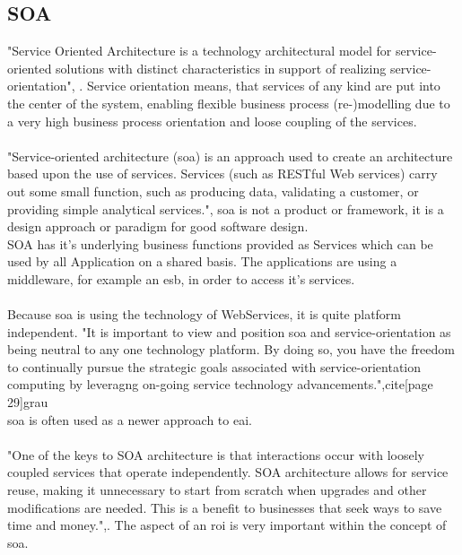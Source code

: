 \documentclass[10pt]{article}
\begin{document}
\subsection{SOA}
"Service Oriented Architecture is a technology architectural model for service-oriented solutions with distinct characteristics in support of realizing service-orientation", \cite[page 27]{grau}. Service orientation means, that services of any kind are put into the center of the system, enabling flexible business process (re-)modelling due to a very high business process orientation and loose coupling of the services.\\  \\
"Service-oriented architecture (\gls{soa}) is an approach used to create an architecture based upon the use of services. Services (such as RESTful Web services) carry out some small function, such as producing data, validating a customer, or providing simple analytical services.",\cite{searchsoa} \gls{soa} is not a product or framework, it is a design approach or paradigm for good software design.
\\
SOA has it's underlying business functions provided as Services which can be used by all Application on a shared basis. The applications are using a middleware, for example an \gls{esb}, in order to access it's services. \\
\\Because \gls{soa} is using the technology of WebServices, it is quite platform independent. 
"It is important to view and position \gls{soa} and service-orientation as being neutral to any one technology platform. By doing so, you have the freedom to continually pursue the strategic goals associated with service-orientation computing by leveragng on-going service technology advancements.",cite[page 29]{grau} \\
\gls{soa} is often used as a newer approach to \gls{eai}. \cite{soaitwissen}
\\ \\
"One of the keys to SOA architecture is that interactions occur with loosely coupled services that operate independently. SOA architecture allows for service reuse, making it unnecessary to start from scratch when upgrades and other modifications are needed. This is a benefit to businesses that seek ways to save time and money.",\cite{searchsoa}. The aspect of an \gls{roi} is very important within the concept of \gls{soa}.
\end{document}
